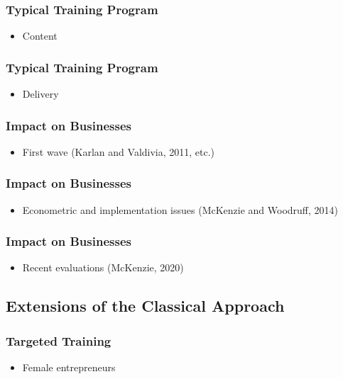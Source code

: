 \documentclass[10pt]{beamer}
\begin{document}

\begin{frame}
\frametitle{Typical Training Program}
	\begin{itemize}
	\item Content %
	\vspace{0.1in}
	\end{itemize}
\end{frame}

\begin{frame}
\frametitle{Typical Training Program}
	\begin{itemize}
	\item Delivery %
	\vspace{0.1in}
	\end{itemize}
\end{frame}


\begin{frame}
\frametitle{Impact on Businesses}
	\begin{itemize}
	\item First wave (Karlan and Valdivia, 2011, etc.)
	\vspace{0.1in}
	\end{itemize}
\end{frame}

\begin{frame}
\frametitle{Impact on Businesses}
	\begin{itemize}
	\item Econometric and implementation issues (McKenzie and Woodruff, 2014)
	\vspace{0.1in}
	\end{itemize}
\end{frame}

\begin{frame}
\frametitle{Impact on Businesses}
	\begin{itemize}
	\item Recent evaluations (McKenzie, 2020)
	\vspace{0.1in}
	\end{itemize}
\end{frame}


\subsection{Extensions of the Classical Approach}

\begin{frame}
\frametitle{Targeted Training}
	\begin{itemize}
	\item Female entrepreneurs
	\vspace{0.1in}
	\end{itemize}
\end{frame}
\end{document}
